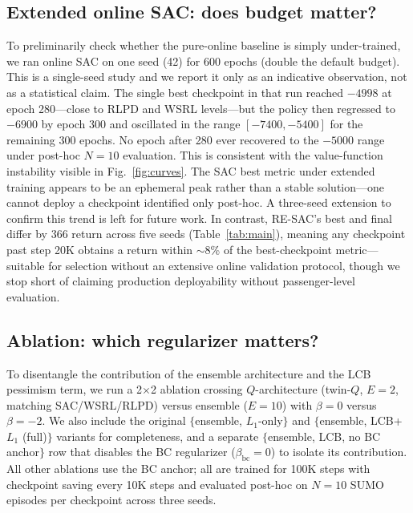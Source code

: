 \documentclass[journal,10pt]{IEEEtran}
\begin{document}
\subsection{Extended online SAC: does budget matter?}
\label{sec:sac600}

To preliminarily check whether the pure-online baseline is simply under-trained, we ran online SAC on one seed (42) for 600 epochs (double the default budget). This is a single-seed study and we report it only as an indicative observation, not as a statistical claim. The single best checkpoint in that run reached $-4998$ at epoch 280---close to RLPD and WSRL levels---but the policy then regressed to $-6900$ by epoch 300 and oscillated in the range $[-7400, -5400]$ for the remaining 300 epochs. No epoch after 280 ever recovered to the $-5000$ range under post-hoc $N=10$ evaluation. This is consistent with the value-function instability visible in Fig.~\ref{fig:curves}. The SAC best metric under extended training appears to be an ephemeral peak rather than a stable solution---one cannot deploy a checkpoint identified only post-hoc. A three-seed extension to confirm this trend is left for future work. In contrast, RE-SAC's best and final differ by 366 return across five seeds (Table~\ref{tab:main}), meaning any checkpoint past step 20K obtains a return within $\sim$8\% of the best-checkpoint metric---suitable for selection without an extensive online validation protocol, though we stop short of claiming production deployability without passenger-level evaluation.

\subsection{Ablation: which regularizer matters?}
\label{sec:ablation}

To disentangle the contribution of the ensemble architecture and the LCB pessimism term, we run a 2$\times$2 ablation crossing $Q$-architecture (twin-$Q$, $E=2$, matching SAC/WSRL/RLPD) versus ensemble ($E=10$) with $\beta=0$ versus $\beta=-2$. We also include the original $\{$ensemble, $L_1$-only$\}$ and $\{$ensemble, LCB+$L_1$ (full)$\}$ variants for completeness, and a separate $\{$ensemble, LCB, no BC anchor$\}$ row that disables the BC regularizer ($\beta_{\text{bc}}=0$) to isolate its contribution. All other ablations use the BC anchor; all are trained for 100K steps with checkpoint saving every 10K steps and evaluated post-hoc on $N=10$ SUMO episodes per checkpoint across three seeds.
\end{document}
